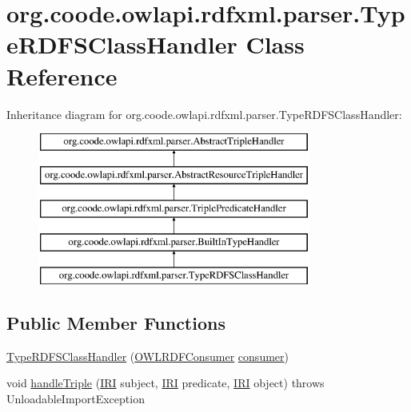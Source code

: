 \hypertarget{classorg_1_1coode_1_1owlapi_1_1rdfxml_1_1parser_1_1_type_r_d_f_s_class_handler}{\section{org.\-coode.\-owlapi.\-rdfxml.\-parser.\-Type\-R\-D\-F\-S\-Class\-Handler Class Reference}
\label{classorg_1_1coode_1_1owlapi_1_1rdfxml_1_1parser_1_1_type_r_d_f_s_class_handler}
}
Inheritance diagram for org.\-coode.\-owlapi.\-rdfxml.\-parser.\-Type\-R\-D\-F\-S\-Class\-Handler\-:\begin{figure}[H]
\begin{center}
\leavevmode
\includegraphics[height=5.000000cm]{classorg_1_1coode_1_1owlapi_1_1rdfxml_1_1parser_1_1_type_r_d_f_s_class_handler}
\end{center}
\end{figure}
\subsection*{Public Member Functions}
\begin{DoxyCompactItemize}
\item 
\hyperlink{classorg_1_1coode_1_1owlapi_1_1rdfxml_1_1parser_1_1_type_r_d_f_s_class_handler_a95107d47fa7de7593380768cff0cd928}{Type\-R\-D\-F\-S\-Class\-Handler} (\hyperlink{classorg_1_1coode_1_1owlapi_1_1rdfxml_1_1parser_1_1_o_w_l_r_d_f_consumer}{O\-W\-L\-R\-D\-F\-Consumer} \hyperlink{classorg_1_1coode_1_1owlapi_1_1rdfxml_1_1parser_1_1_abstract_triple_handler_a4ccf4d898ff01eb1cadfa04b23d54e9c}{consumer})
\item 
void \hyperlink{classorg_1_1coode_1_1owlapi_1_1rdfxml_1_1parser_1_1_type_r_d_f_s_class_handler_a97fe5d40c37685316c994db09e2715a1}{handle\-Triple} (\hyperlink{classorg_1_1semanticweb_1_1owlapi_1_1model_1_1_i_r_i}{I\-R\-I} subject, \hyperlink{classorg_1_1semanticweb_1_1owlapi_1_1model_1_1_i_r_i}{I\-R\-I} predicate, \hyperlink{classorg_1_1semanticweb_1_1owlapi_1_1model_1_1_i_r_i}{I\-R\-I} object)  throws Unloadable\-Import\-Exception 
\end{DoxyCompactItemize}
